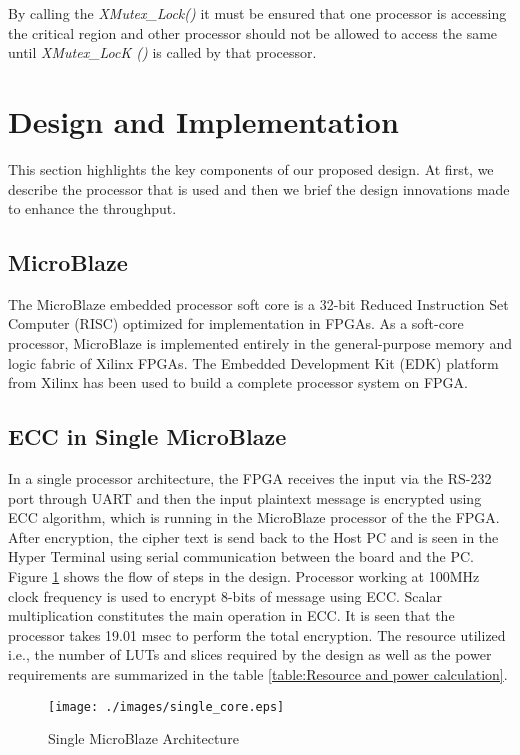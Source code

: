 \documentclass[preprint,12pt]{elsarticle}
\begin{document}
By calling the {\em XMutex\_Lock()} it must be ensured that one processor is accessing the critical region and other processor should not be allowed to access the same until {\em XMutex\_LocK ()} is called by that processor.

\vspace{-10pt}
\section{Design and Implementation}
This section highlights the key components of our proposed design. At first, we describe the processor that is used and then we brief the design innovations made to enhance the throughput.
\subsection{MicroBlaze}
The MicroBlaze embedded processor soft core is a 32-bit Reduced Instruction Set Computer (RISC) optimized for implementation in FPGAs\cite{mbl}. As a soft-core processor, MicroBlaze is implemented entirely in the general-purpose memory and logic fabric of Xilinx FPGAs. The Embedded Development Kit (EDK) platform from Xilinx has been used to build a complete processor system on FPGA.

\subsection{ ECC in Single MicroBlaze}
In a single processor architecture, the FPGA receives the input via the RS-232 port through UART and then the input plaintext message is encrypted using ECC algorithm, which is running in the MicroBlaze processor of the the FPGA. After encryption, the cipher text is send back to the Host PC and is seen in the Hyper Terminal using serial communication between the board and the PC. Figure \ref{single} shows the flow of steps in the design. Processor working at 100MHz clock frequency is used to encrypt 8-bits of message using ECC.  Scalar multiplication constitutes the main operation in ECC. It is seen that the processor takes 19.01 msec to perform the total encryption. The resource utilized i.e., the number of LUTs and slices required by the design as well as the power requirements are summarized in the table \ref{table:Resource and power calculation}.
\begin{figure}[htbp]
\vspace{-40pt}
\centering
\texttt{[image: ./images/single\_core.eps]}
\caption{Single MicroBlaze Architecture}
\label{single}
\vspace{-14pt}
\end{figure}
\end{document}
